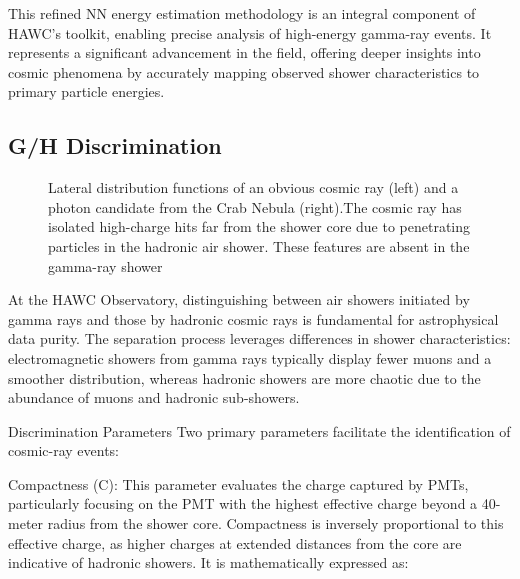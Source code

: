 This refined NN energy estimation methodology is an integral component of HAWC's toolkit, enabling precise analysis of high-energy gamma-ray events. It represents a significant advancement in the field, offering deeper insights into cosmic phenomena by accurately mapping observed shower characteristics to primary particle energies.

\subsection{G/H Discrimination}

\begin{figure}
    \caption{Lateral distribution functions of an obvious cosmic ray (left) and a photon candidate from the Crab Nebula (right).The cosmic ray has isolated high-charge hits far from the shower core due to penetrating particles in the hadronic air shower. These features are absent in the gamma-ray shower}
    \label{fig:ldf_particleshower}
\end{figure}

At the HAWC Observatory, distinguishing between air showers initiated by gamma rays and those by hadronic cosmic rays is fundamental for astrophysical data purity. The separation process leverages differences in shower characteristics: electromagnetic showers from gamma rays typically display fewer muons and a smoother distribution, whereas hadronic showers are more chaotic due to the abundance of muons and hadronic sub-showers.

Discrimination Parameters
Two primary parameters facilitate the identification of cosmic-ray events:

Compactness (C): This parameter evaluates the charge captured by PMTs, particularly focusing on the PMT with the highest effective charge beyond a 40-meter radius from the shower core. Compactness is inversely proportional to this effective charge, as higher charges at extended distances from the core are indicative of hadronic showers. It is mathematically expressed as:
\compactness

